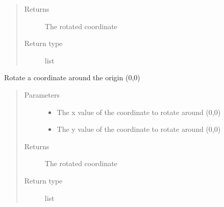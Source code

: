 \documentclass[letterpaper,10pt,english]{sphinxmanual}
\begin{document}
\begin{fulllineitems}
\begin{fulllineitems}
\begin{quote}
\begin{description}
\begin{itemize}
\end{itemize}

\item[{Returns}] \leavevmode
\sphinxAtStartPar
The rotated coordinate

\item[{Return type}] \leavevmode
\sphinxAtStartPar
list

\end{description}\end{quote}

\end{fulllineitems}


\begin{fulllineitems}
\label{\detokenize{index:generator.generator.rotate_around_origin}}
\sphinxAtStartPar
Rotate a coordinate around the origin (0,0)
\begin{quote}\begin{description}
\item[{Parameters}] \leavevmode\begin{itemize}
\item {} 
\sphinxAtStartPar
{} \textendash{} The x value of the coordinate to rotate around (0,0)

\item {} 
\sphinxAtStartPar
{} \textendash{} The y value of the coordinate to rotate around (0,0)

\end{itemize}

\item[{Returns}] \leavevmode
\sphinxAtStartPar
The rotated coordinate

\item[{Return type}] \leavevmode
\sphinxAtStartPar
list

\end{description}\end{quote}

\end{fulllineitems}



\end{fulllineitems}
\end{document}
